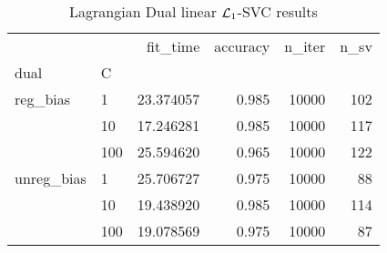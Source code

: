 \begin{table}[H]
\centering
\caption{Lagrangian Dual linear $\protect \mathcal{L}_1$-SVC results}
\label{linear_lagrangian_dual_l1_svc_cv_results}
\begin{tabular}{llrrrr}
\toprule
           &     &   fit\_time &  accuracy &  n\_iter &  n\_sv \\
dual & C &            &           &         &       \\
\midrule
reg\_bias & 1   &  23.374057 &     0.985 &   10000 &   102 \\
           & 10  &  17.246281 &     0.985 &   10000 &   117 \\
           & 100 &  25.594620 &     0.965 &   10000 &   122 \\
unreg\_bias & 1   &  25.706727 &     0.975 &   10000 &    88 \\
           & 10  &  19.438920 &     0.985 &   10000 &   114 \\
           & 100 &  19.078569 &     0.975 &   10000 &    87 \\
\bottomrule
\end{tabular}
\end{table}
